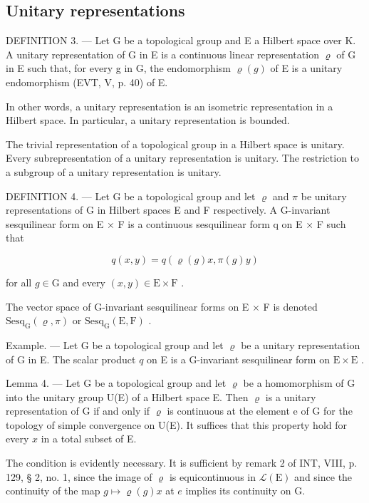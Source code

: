 \subsection{Unitary representations}

DEFINITION 3. --- Let G be a topological group and E a Hilbert space over K. A unitary representation of G in E is a continuous linear representation \(\varrho\) of G in E such that, for every g in G, the endomorphism \(\varrho(g)\) of E is a unitary endomorphism (EVT, V, p. 40) of E.

In other words, a unitary representation is an isometric representation in a Hilbert space. In particular, a unitary representation is bounded.

The trivial representation of a topological group in a Hilbert space is unitary. Every subrepresentation of a unitary representation is unitary. The restriction to a subgroup of a unitary representation is unitary.

DEFINITION 4. --- Let G be a topological group and let \(\varrho\) and \(\pi\) be unitary representations of G in Hilbert spaces E and F respectively. A G-invariant sesquilinear form on E × F is a continuous sesquilinear form q on E × F such that

\[
q (x, y) = q (\varrho (g) x, \pi (g) y)
\]

for all \(g \in \mathrm{G}\) and every \((x, y) \in \mathrm{E} \times \mathrm{F}\) .

The vector space of G-invariant sesquilinear forms on E × F is denoted \(\mathrm{Sesq}_{\mathrm{G}}(\varrho,\pi)\) or \(\mathrm{Sesq}_{\mathrm{G}}(\mathrm{E},\mathrm{F})\) .

Example. --- Let G be a topological group and let \(\varrho\) be a unitary representation of G in E. The scalar product \(q\) on E is a G-invariant sesquilinear form on \(\mathrm{E} \times \mathrm{E}\) .

Lemma 4. --- Let G be a topological group and let \(\varrho\) be a homomorphism of G into the unitary group U(E) of a Hilbert space E. Then \(\varrho\) is a unitary representation of G if and only if \(\varrho\) is continuous at the element e of G for the topology of simple convergence on U(E). It suffices that this property hold for every \(x\) in a total subset of E.

The condition is evidently necessary. It is sufficient by remark 2 of INT, VIII, p. 129, § 2, no. 1, since the image of \(\varrho\) is equicontinuous in \(\mathcal{L}(\mathrm{E})\) and since the continuity of the map \(g \mapsto \varrho(g)x\) at \(e\) implies its continuity on G.

